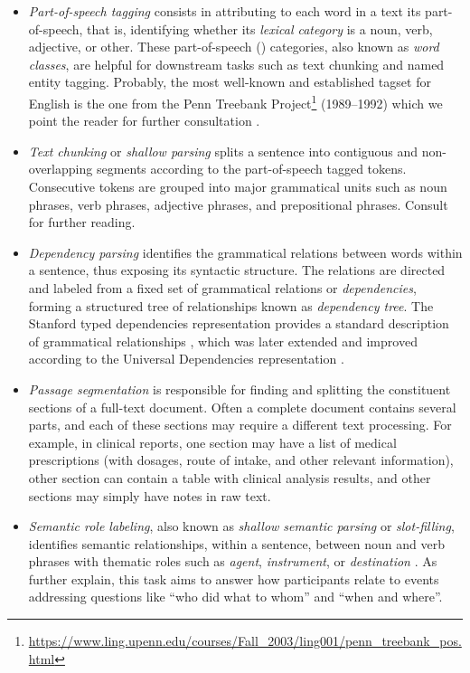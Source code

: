 \begin{itemize}
\item
\textit{Part-of-speech tagging} consists in attributing to each word in a text its part-of-speech, that is, identifying whether its \textit{lexical category} is a noun, verb, adjective, or other.
These part-of-speech () categories, also known as \textit{word classes}, are helpful for downstream tasks such as text chunking and named entity tagging.
Probably, the most well-known and established  tagset for English is the one from the Penn Treebank Project\footnote{\url{https://www.ling.upenn.edu/courses/Fall_2003/ling001/penn_treebank_pos.html}} (1989--1992) which we point the reader for further consultation \parencite{santorini1990a,marcus1993a}.

\item
\textit{Text chunking} or \textit{shallow parsing} splits a sentence into contiguous and non-overlapping segments according to the part-of-speech tagged tokens.
Consecutive tokens are grouped into major grammatical units such as noun phrases, verb phrases, adjective phrases, and prepositional phrases.
Consult \textcite{abney1991a,sang1999a} for further reading.

\item
\textit{Dependency parsing} identifies the grammatical relations between words within a sentence, thus exposing its syntactic structure.
The relations are directed and labeled from a fixed set of grammatical relations or \textit{dependencies}, forming a structured tree of relationships known as \textit{dependency tree}.
The Stanford typed dependencies representation provides a standard description of grammatical relationships \parencite{marneffe2008a,marneffe2016a}, which was later extended and improved according to the Universal Dependencies representation \parencite{schuster2016a}.

\item
\textit{Passage segmentation} is responsible for finding and splitting the constituent sections of a full-text document.
Often a complete document contains several parts, and each of these sections may require a different text processing.
For example, in clinical reports, one section may have a list of medical prescriptions (with dosages, route of intake, and other relevant information), other section can contain a table with clinical analysis results, and other sections may simply have notes in raw text.

\item
\textit{Semantic role labeling}, also known as \textit{shallow semantic parsing} or \textit{slot-filling}, identifies semantic relationships, within a sentence, between noun and verb phrases with thematic roles such as \textit{agent}, \textit{instrument}, or \textit{destination} \parencite{gildea2000a,gildea2002a,jurafsky2018a}.
As \textcite{jurafsky2018a} further explain, this task aims to answer how participants relate to events addressing questions like ``who did what to whom'' and ``when and where''.

\end{itemize}


